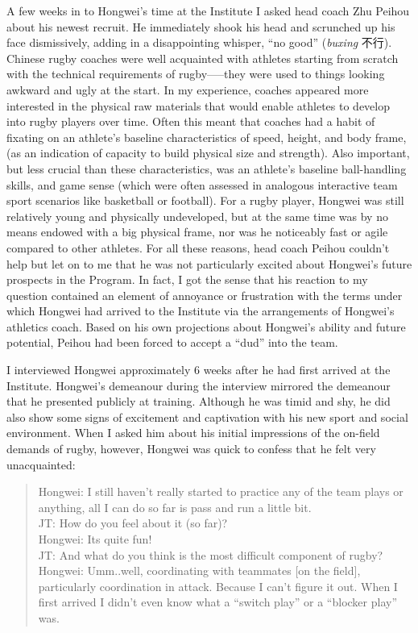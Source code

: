 A few weeks in to Hongwei’s time at the Institute I asked head coach Zhu Peihou about his newest recruit.  He immediately shook his head and scrunched up his face dismissively, adding in a disappointing whisper, ``no good'' (\textit{buxing} 不行).  Chinese rugby coaches were well acquainted with athletes starting from scratch with the technical requirements of rugby—--they were used to things looking awkward and ugly at the start.  In my experience, coaches appeared more interested in the physical raw materials that would enable athletes to develop into rugby players over time.  Often this meant that coaches had a habit of fixating on an athlete's baseline characteristics of speed, height, and body frame, (as an indication of capacity to build physical size and strength).  Also important, but less crucial than these characteristics, was an athlete’s baseline ball-handling skills, and game sense (which were often assessed in analogous interactive team sport scenarios like basketball or football).  For a rugby player, Hongwei was still relatively young and physically undeveloped, but at the same time was by no means endowed with a big physical frame, nor was he noticeably fast or agile compared to other athletes.  For all these reasons, head coach Peihou couldn’t help but let on to me that he was not particularly excited about Hongwei's future prospects in the Program.  In fact, I got the sense that his reaction to my question contained an element of annoyance or frustration with the terms under which Hongwei had arrived to the Institute via the arrangements of Hongwei’s athletics coach.  Based on his own projections about Hongwei's ability and future potential, Peihou had been forced to accept a ``dud'' into the team.

I interviewed Hongwei approximately 6 weeks after he had first arrived at the Institute.   Hongwei's demeanour during the interview mirrored the demeanour that he presented publicly at training.  Although he was timid and shy, he did also show some signs of excitement and captivation with his new sport and social environment.  When I asked him about his initial impressions of the on-field demands of rugby, however, Hongwei was quick to confess that he felt very unacquainted:

\begin{quotation}
  Hongwei: I still haven’t really started to practice any of the team plays or anything, all I can do so far is pass and run a little bit. \\
  JT: How do you feel about it (so far)? \\
  Hongwei: Its quite fun! \\
  JT: And what do you think is the most difficult component of rugby? \\
  Hongwei: Umm..well, coordinating with teammates [on the field], particularly coordination in attack.  Because I can't figure it out. When I first arrived I didn’t even know what a ``switch play'' or a ``blocker play'' was.
\end{quotation}


